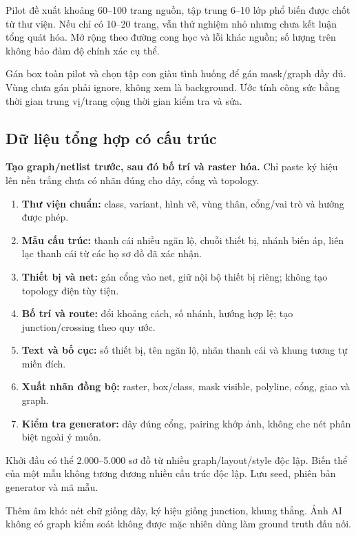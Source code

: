 \documentclass[11pt,a4paper]{article}
\begin{document}
Pilot đề xuất khoảng 60--100 trang nguồn, tập trung 6--10 lớp phổ biến được chốt từ thư viện. Nếu chỉ có 10--20 trang, vẫn thử nghiệm nhỏ nhưng chưa kết luận tổng quát hóa. Mở rộng theo đường cong học và lỗi khác nguồn; số lượng trên không bảo đảm độ chính xác cụ thể.

Gán box toàn pilot và chọn tập con giàu tình huống để gán mask/graph đầy đủ. Vùng chưa gán phải ignore, không xem là background. Ước tính công sức bằng thời gian trung vị/trang cộng thời gian kiểm tra và sửa.

\subsection{Dữ liệu tổng hợp có cấu trúc}
\textbf{Tạo graph/netlist trước, sau đó bố trí và raster hóa.} Chỉ paste ký hiệu lên nền trắng chưa có nhãn đúng cho dây, cổng và topology.
\begin{enumerate}
  \item \textbf{Thư viện chuẩn:} class, variant, hình vẽ, vùng thân, cổng/vai trò và hướng được phép.
  \item \textbf{Mẫu cấu trúc:} thanh cái nhiều ngăn lộ, chuỗi thiết bị, nhánh biến áp, liên lạc thanh cái từ các họ sơ đồ đã xác nhận.
  \item \textbf{Thiết bị và net:} gán cổng vào net, giữ nội bộ thiết bị riêng; không tạo topology điện tùy tiện.
  \item \textbf{Bố trí và route:} đổi khoảng cách, số nhánh, hướng hợp lệ; tạo junction/crossing theo quy ước.
  \item \textbf{Text và bố cục:} số thiết bị, tên ngăn lộ, nhãn thanh cái và khung tương tự miền đích.
  \item \textbf{Xuất nhãn đồng bộ:} raster, box/class, mask visible, polyline, cổng, giao và graph.
  \item \textbf{Kiểm tra generator:} dây đúng cổng, pairing khớp ảnh, không che nét phân biệt ngoài ý muốn.
\end{enumerate}
Khởi đầu có thể 2.000--5.000 sơ đồ từ nhiều graph/layout/style độc lập. Biến thể của một mẫu không tương đương nhiều cấu trúc độc lập. Lưu seed, phiên bản generator và mã mẫu.

Thêm âm khó: nét chữ giống dây, ký hiệu giống junction, khung thẳng. Ảnh AI không có graph kiểm soát không được mặc nhiên dùng làm ground truth đấu nối.
\end{document}
